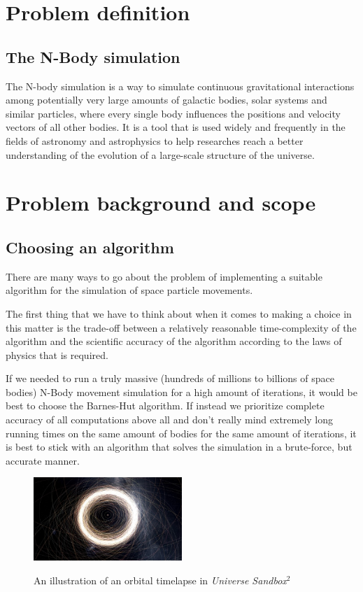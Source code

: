 \documentclass[journal]{IEEEtran}
\begin{document}
	\section{Problem definition}
	
		\subsection*{The N-Body simulation}
		
			The N-body simulation is a way to simulate continuous gravitational interactions among potentially very large amounts of galactic bodies, solar systems and similar particles, where every single body influences the positions and velocity vectors of all other bodies. It is a tool that is used widely and frequently in the fields of astronomy and astrophysics to help researches reach a better understanding of the evolution of a large-scale structure of the universe.\cite{scholarpedia}		
	
	\section{Problem background and scope}
	\label{algs}
	
		\subsection*{Choosing an algorithm}
	
			There are many ways to go about the problem of implementing a suitable algorithm for the simulation of space particle movements. 
			
			The first thing that we have to think about when it comes to making a choice in this matter is the trade-off between a relatively reasonable time-complexity of the algorithm and the scientific accuracy of the algorithm according to the laws of physics that is required.
			
			If we needed to run a truly massive (hundreds of millions to billions of space bodies) N-Body movement simulation for a high amount of iterations, it would be best to choose the Barnes-Hut algorithm. If instead we prioritize complete accuracy of all computations above all and don't really mind extremely long running times on the same amount of bodies for the same amount of iterations, it is best to stick with an algorithm that solves the simulation in a brute-force, but accurate manner.
	
		\begin{figure}[ht]
			\centering
			\includegraphics[width=0.5\textwidth]{sandbox2.jpg}
			\caption{An illustration of an orbital timelapse in \textit{Universe Sandbox$^2$}}
			\cite{nbodypic}
		\end{figure} 
	
\end{document}
